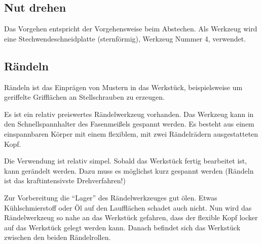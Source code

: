 \documentclass{\basedir/fablab-document}
\begin{document}
\subsection{Nut drehen}

Das Vorgehen entspricht der Vorgehensweise beim Abstechen.
Als Werkzeug wird eine Stechwendeschneidplatte (sternförmig), Werkzeug Nummer 4, verwendet.


\subsection{Rändeln}
\label{handdrehen:raendeln}

Rändeln ist das Einprägen von Mustern in das Werkstück, beispielsweise um geriffelte Grifflächen an Stellschrauben zu erzeugen.

Es ist ein relativ preiswertes Rändelwerkzeug vorhanden.
Das Werkzeug kann in den Schnellspannhalter des Fasenmeißels gespannt werden.
Es besteht aus einem einspannbaren Körper mit einem flexiblem, mit zwei Rändelrädern ausgestatteten Kopf.

Die Verwendung ist relativ simpel.
Sobald das Werkstück fertig bearbeitet ist, kann gerändelt werden.
Dazu muss es möglichst kurz gespannt werden (Rändeln ist das kraftintensivste Drehverfahren!)

Zur Vorbereitung die \enquote{Lager} des Rändelwerkzeuges gut ölen.
Etwas Kühlschmierstoff oder Öl auf den Laufflächen schadet auch nicht. 
Nun wird das Rändelwerkzeug so nahe an das Werkstück gefahren, dass der flexible Kopf locker auf das Werkstück gelegt werden kann.
Danach befindet sich das Werkstück zwischen den beiden Rändelrollen.
\end{document}
